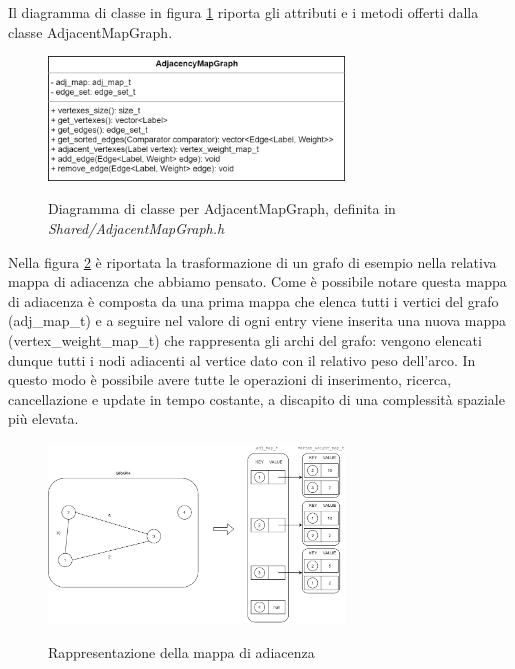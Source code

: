 Il diagramma di classe in figura \ref{fig:AdjMapGraph Class} riporta gli attributi e i metodi offerti dalla classe AdjacentMapGraph.

\begin{figure}[h]
	\caption{Diagramma di classe per AdjacentMapGraph, definita in \textit{Shared/AdjacentMapGraph.h}}
	\centering
	\includegraphics[width=0.7\textwidth]{./images/AdjancencyMapGrapClass.png}
	\label{fig:AdjMapGraph Class}
\end{figure}

Nella figura \ref{fig:AdjMapGraph Abstract} è riportata la trasformazione di un grafo di esempio nella relativa mappa di adiacenza che abbiamo pensato. Come è possibile notare questa mappa di adiacenza è composta da una prima mappa che elenca tutti i vertici del grafo (adj\_map\_t) e a seguire nel valore di ogni entry viene inserita una nuova mappa (vertex\_weight\_map\_t) che rappresenta gli archi del grafo: vengono elencati dunque tutti i nodi adiacenti al vertice dato con il relativo peso dell'arco. In questo modo è possibile avere tutte le operazioni di inserimento, ricerca, cancellazione e update in tempo costante, a discapito di una complessità spaziale più elevata. 

\begin{figure}[h]
	\caption{Rappresentazione della mappa di adiacenza}
	\centering
	\includegraphics[width=0.7\textwidth]{./images/AdjMapGraphAbstract.png}
	\label{fig:AdjMapGraph Abstract}
\end{figure}

